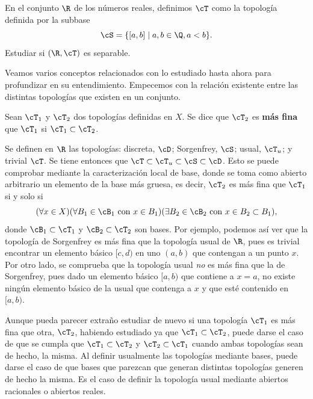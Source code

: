 {}

\begin{ex}
    En el conjunto \(\R\) de los números reales, definimos \(\cT\) como la topología definida por la subbase 
    \[
        \cS = \{[a,b] \mid a, b \in \Q, a < b\}.
    \]
    Estudiar si \((\R,\cT)\) es separable.
\end{ex}


\begin{amp}
    Veamos varios conceptos relacionados con lo estudiado hasta ahora para profundizar en su entendimiento. Empecemos con la relación existente entre las distintas topologías que existen en un conjunto.
    \begin{deff}
        Sean $\cT_1$ y $\cT_2$ dos topologías definidas en $X$. Se dice que $\cT_2$ es {\bf más fina} que $\cT_1$ si $\cT_1\subset\cT_2$.
    \end{deff}
    \begin{ej}
        Se definen en $\R$ las topologías: discreta, $\cD$; Sorgenfrey, $\cS$; usual, $\cT_u$; y trivial $\cT$. Se tiene entonces que $\cT \subset\cT_u \subset\cS \subset\cD$. Esto se puede comprobar 
        mediante la caracterización local de base, donde se toma como abierto arbitrario un elemento de la base más gruesa, es decir, $\cT_2$ es más fina que $\cT_1$ si y solo si
        \[
            (\forall x \in X) (\forall B_1 \in \cB_1 \text{ con } x\in B_1) (\exists B_2 \in\cB_2 \text{ con } x\in B_2 \subset B_1),
        \]
        donde $\cB_1\subset\cT_1$ y $\cB_2\subset\cT_2$ son bases. Por ejemplo, podemos así ver que la topología de Sorgenfrey es más fina que la topología usual de $\R$, pues es trivial encontrar un elemento básico $[c,d)$ en uno $(a,b)$ que contengan a un punto $x$. Por otro lado, se comprueba que la topología usual \textit{no} es más fina que la de Sorgenfrey, pues dado un elemento básico $[a,b)$ que contiene a $x = a$, no existe ningún elemento básico de la usual que contenga a $x$ y que esté contenido en $[a,b)$.
    \end{ej}
    Aunque pueda parecer extraño estudiar de nuevo si una topología $\cT_1$ es más fina que otra, $\cT_2$, habiendo estudiado ya que $\cT_1 \subset \cT_2$, puede darse el caso de que se cumpla que $\cT_1 \subset \cT_2$ y $\cT_2 \subset \cT_1$ cuando ambas topologías sean de hecho, la misma. Al definir usualmente las topologías mediante bases, puede darse el caso de que bases que parezcan que generan distintas topologías generen de hecho la misma. Es el caso de definir la topología usual mediante abiertos racionales o abiertos reales.


\end{amp}
